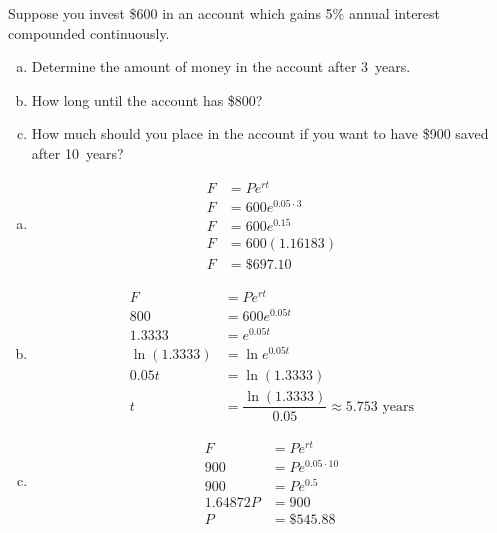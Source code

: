 \documentclass[11pt,letterpaper]{article}
\begin{document}
\newpage





 Suppose you invest \$600 in an account which gains 5\% annual interest compounded continuously. 
        \begin{enumerate}[(a)]
        \item Determine the amount of money in the account after 3~years.
        \item How long until the account has \$800?
        \item How much should you place in the account if you want to have \$900 saved after 10~years?
        \end{enumerate} \pspace

\sol 
\begin{enumerate}[(a)]
\item 
	\[
	\begin{aligned}
	F&= Pe^{rt} \\
	F&= 600 e^{0.05 \cdot 3} \\
	F&= 600 e^{0.15} \\
	F&= 600(1.16183) \\
	F&= \$697.10
	\end{aligned}
	\] \pspace

\item 
	\[
	\begin{aligned}
	F&= Pe^{rt} \\
	800&= 600 e^{0.05 t} \\
	1.3333&= e^{0.05t} \\
	\ln(1.3333)&= \ln e^{0.05t} \\
	0.05t&= \ln(1.3333) \\
	t&= \dfrac{\ln(1.3333)}{0.05} \approx 5.753 \text{ years}
	\end{aligned}
	\] \pspace

\item 
	\[
	\begin{aligned}
	F&= Pe^{rt} \\
	900&= P e^{0.05 \cdot 10} \\
	900&= P e^{0.5} \\
	1.64872P&= 900 \\
	P&= \$545.88
	\end{aligned}
	\]
\end{enumerate}





\newpage
\end{document}

